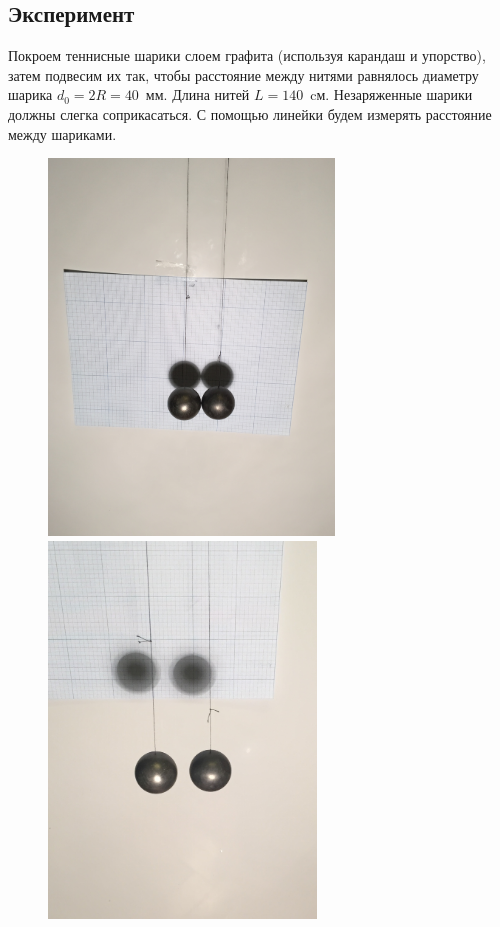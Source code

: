 \documentclass[a4paper, 12pt]{article}
\begin{document}
\subsection*{Эксперимент}
Покроем теннисные шарики слоем графита (используя карандаш и упорство), затем подвесим их так, чтобы расстояние между нитями равнялось диаметру шарика $d_0=2R=40$~мм. Длина нитей $L=140$~cм. Незаряженные шарики должны слегка соприкасаться. С помощью линейки будем измерять расстояние между шариками.

\begin{figure}[h]\centering
\begin{center}
\begin{minipage}[h]{0.45 \linewidth}
\includegraphics[height=10cm]{3}
\end{minipage}
\qquad
\begin{minipage}[h]{0.45 \linewidth}
\includegraphics[height=10cm]{5}
\end{minipage}
\end{center}
\end{figure}
\vspace{-.4cm}
\end{document}
